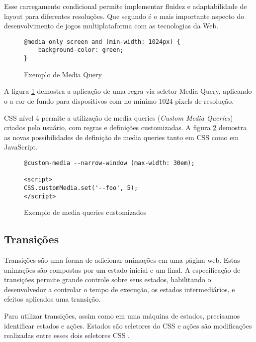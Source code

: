 Esse carregamento condicional  permite implementar fluidez e
adaptabilidade de layout para diferentes resoluções. Que segundo
\citet{HTML5CrossPlatformGameDevelopment} é o mais importante aspecto do
desenvolvimento de jogos multiplataforma com as tecnologias da Web.

\begin{figure}[H]
\centering
\begin{verbatim}
@media only screen and (min-width: 1024px) {
    background-color: green;
}
\end{verbatim}
\caption{Exemplo de Media Query}
\label{fig:MediaQuery}
\end{figure}

A figura \ref{fig:MediaQuery} demostra a aplicação de uma regra via
seletor Media Query, aplicando o a cor de fundo para dispositivos com no
mínimo 1024 pixels de resolução.

CSS nível 4 permite a utilização de media queries (\textit{Custom
Media Queries}) criados pelo usuário, com regras e definições
customizadas. A figura \ref{fig:MediaQueryCustom} demostra as novas
possibilidades de definição de media queries tanto em CSS como em
JavaScript.

\begin{figure}[H]
\centering
\begin{verbatim}
@custom-media --narrow-window (max-width: 30em);

<script>
CSS.customMedia.set('--foo', 5);
</script>

\end{verbatim}
\caption{Exemplo de media queries customizados}
\label{fig:MediaQueryCustom}
\end{figure}


\subsection{Transições}

Transições são uma forma de adicionar animações em uma página
web. Estas animações são compostas por um estado inicial e um final.
A especificação de transições permite grande controle sobre seus
estados, habilitando o desenvolvedor a controlar o tempo de execução,
os estados intermediários, e efeitos aplicados uma transição.

Para utilizar transições, assim como em uma máquina de estados,
precisamos identificar estados e ações. Estados são seletores do CSS
e ações são modificações realizadas entre esses dois seletores CSS
\autocite{html5mostwanted}.

